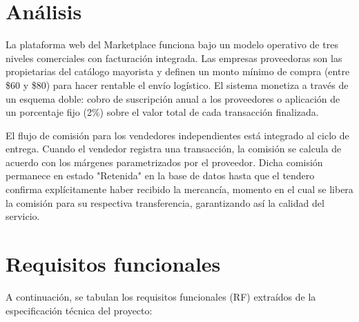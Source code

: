 \documentclass[12pt,spanish,a4paper]{report}
\begin{document}
\section{Análisis}
La plataforma web del Marketplace funciona bajo un modelo operativo de tres niveles comerciales con facturación integrada.
Las empresas proveedoras son las propietarias del catálogo mayorista y definen un monto mínimo de compra (entre \$60 y \$80) para hacer rentable el envío logístico. El sistema monetiza a través de un esquema doble: cobro de suscripción anual a los proveedores o aplicación de un porcentaje fijo (2\%) sobre el valor total de cada transacción finalizada.

El flujo de comisión para los vendedores independientes está integrado al ciclo de entrega. Cuando el vendedor registra una transacción, la comisión se calcula de acuerdo con los márgenes parametrizados por el proveedor. Dicha comisión permanece en estado "Retenida" en la base de datos hasta que el tendero confirma explícitamente haber recibido la mercancía, momento en el cual se libera la comisión para su respectiva transferencia, garantizando así la calidad del servicio.

\section{Requisitos funcionales}
A continuación, se tabulan los requisitos funcionales (RF) extraídos de la especificación técnica del proyecto:
\end{document}
